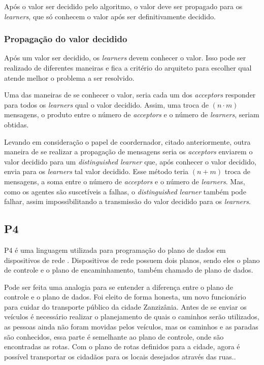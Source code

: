 \documentclass[
    12pt,
    openright, 
    oneside,
    a4paper,
    french,
    english,
    brazil
    ]{facom-ufu-abntex2}
\theoremstyle{definition}
\begin{document}
Após o valor ser decidido pelo algoritmo, o valor deve ser propagado para os \emph{learners},
que só conhecem o valor após ser definitivamente decidido.

\subsubsection{Propagação do valor decidido}
Após um valor ser decidido, os \emph{learners} devem conhecer o valor. Isso pode ser realizado
de diferentes maneiras e fica a critério do arquiteto para escolher qual atende melhor o
problema a ser resolvido.

Uma das maneiras de se conhecer o valor, seria cada um dos \emph{acceptors} responder para
todos os \emph{learners} qual o valor decidido. Assim, uma troca de $(n \cdot m)$ mensagens, 
o produto entre o número de \emph{acceptors} e o número de \emph{learners}, seriam obtidas.

Levando em consideração o papel de coordernador, citado anteriormente, outra maneira de se 
realizar a propagação de mensagens seria os \emph{acceptors} enviarem o valor decidido para um
\emph{distinguished learner} que, após conhecer o valor decidido, envia para os
\emph{learners} tal valor decidido. Esse método teria $(n + m)$ troca de mensagens,
a soma entre o número de \emph{acceptors} e o número de \emph{learners}. Mas, como os
agentes são suscetíveis a falhas, o \emph{distinguished learner} também pode falhar,
assim impossibilitando a transmissão do valor decidido para os \emph{learners}.

\subsection{P4}
P4 é uma linguagem utilizada para programação do plano de dados em  dispositivos de 
rede \cite{paxos16spec}. Dispositivos de rede possuem dois planos, sendo eles o 
plano de controle e o plano de encaminhamento, também chamado de plano de dados. 

Pode ser feita uma analogia para se entender a diferença entre o 
plano de controle e o plano de dados. Foi eleito de forma honesta, um novo 
funcionário para cuidar do transporte público da cidade Zanzizânia. Antes de se 
enviar os veículos é necessário realizar o planejamento de quais o caminhos serão
utilizados, as pessoas ainda não foram movidas pelos veículos, mas os caminhos 
e as paradas são conhecidos, essa parte é semelhante ao plano de controle, onde 
são encontradas as rotas. Com o plano de rotas definidos para a cidade, agora é 
possível transportar os cidadãos para os locais desejados através das ruas.\cite{dataVsControl}. 
\end{document}
